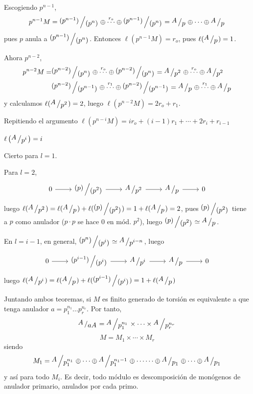 \begin{dem}
    Escogiendo $p^{n-1}$, 
    $$p^{n-1} M = \modulo{(p^{n-1})}{(p^n)} \oplus \overset{r_o}{\cdots} \oplus \modulo{(p^{n-1})}{(p^n)} = \modulo{A}{p} \oplus \cdots \oplus \modulo{A}{p}$$ pues $p$ anula a $\modulo{(p^{n-1})}{(p^n)}$. Entonces $\ell (p^{n-1} M ) = r_o$, pues $\ell(\modulo{A}{p}) = 1$. 

    Ahora $p^{n-2}$, 
    \begin{align*}
        p^{n-2} M = &  \modulo{(p^{n-2})}{(p^n)} \oplus \overset{r_o}{\cdots} \oplus \modulo{(p^{n-2})}{(p^n)}  = \modulo{A}{p^2} \oplus \overset{r_o}{\cdots} \oplus \modulo{A}{p^2} \\ 
        &  \modulo{(p^{n-2})}{(p^{n-1})} \oplus \overset{r_1}{\cdots} \oplus \modulo{(p^{n-2})}{(p^{n-1})} = \modulo{A}{p} \oplus \overset{r_1}{\cdots} \oplus \modulo{A}{p}   
    \end{align*}
    y calculamos $\ell(\modulo{A}{p^2}) = 2$, luego $\ell(p^{n-2} M) = 2r_o + r_1$.

    Repitiendo el argumento $\ell(p^{n-i} M) = ir_{o} + (i-1)r_1 + \cdots + 2r_i + r_{i-1}$
\end{dem}
\begin{lem}
    $\ell\left(\modulo{A}{p^i}\right) = i$
\end{lem}
\begin{dem}
    Cierto para $l=1$.

    Para $l=2$, 
    $$\bt 0 \rar & \modulo{(p)}{(p^2)} \rar & \modulo{A}{p^2}  \rar & \modulo{A}{p} \rar & 0 \et$$
    luego $\ell(\modulo{A}{p^2}) = \ell(\modulo{A}{p} ) + \ell( \modulo{(p)}{(p^2)} ) = 1+\ell(\modulo{A}{p}) = 2$, pues $ \modulo{(p)}{(p^2)} $ tiene a $p$ como anulador ($p \cdot p$ se hace 0 en m\'od. $p^2$), luego $ \modulo{(p)}{(p^2)} \simeq \modulo{A}{p}$.


    En $l=i-1$, en general, $\modulo{(p^n)}{(p^i)} \simeq \modulo{A}{p^{i-n}}$, luego
    $$\bt 0 \rar & \modulo{(p^{i-1})}{(p^i)} \rar & \modulo{A}{p^i}  \rar & \modulo{A}{p} \rar & 0 \et$$
    luego $\ell(\modulo{A}{p^i}) = \ell(\modulo{A}{p}) + \ell(\modulo{(p^{i-1})}{(p^i)}) = 1+\ell(\modulo{A}{p})$
\end{dem}

Juntando ambos teoremas, si $M$ es finito generado de torsi\'on es equivalente a que tenga anulador $a = p_1^{n_1} \dots p_r^{n_r}$. Por tanto, 
$$\modulo{A}{aA} = \modulo{A}{p_1^{n_1}} \times \cdots \times \modulo{A}{p_r^{n_r}}$$
$$M = M_1\times \cdots \times M_r$$
siendo 
$$M_1 = \modulo{A}{p_1^{n_1}} \oplus \cdots \oplus \modulo{A}{p_1^{n_1-1}} \oplus \cdots \cdots \oplus \modulo{A}{p_1} \oplus \cdots \oplus \modulo{A}{p_1}$$
y as\'i para todo $M_i$. Es decir, todo m\'odulo es descomposici\'on de mon\'ogenos de anulador primario, anulados por cada primo. 

